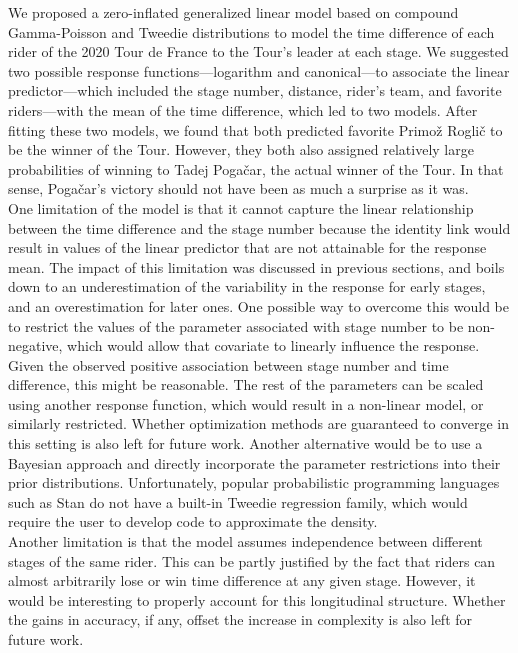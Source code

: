 \documentclass[aos,preprint]{imsart}
\begin{document}
We proposed a zero-inflated generalized linear model based on compound Gamma-Poisson and Tweedie distributions to model the time difference of each rider of the 2020 Tour de France to the Tour's leader at each stage. We suggested two possible response functions---logarithm and canonical---to associate the linear predictor---which included the stage number, distance, rider's team, and favorite riders---with the mean of the time difference, which led to two models. After fitting these two models, we found that both predicted favorite Primož Roglič to be the winner of the Tour. However, they both also assigned relatively large probabilities of winning to Tadej Pogačar, the actual winner of the Tour. In that sense, Pogačar's victory should not have been as much a surprise as it was. \\


One limitation of the model is that it cannot capture the linear relationship between the time difference and the stage number because the identity link would result in values of the linear predictor that are not attainable for the response mean. The impact of this limitation was discussed in previous sections, and boils down to an underestimation of the variability in the response for early stages, and an overestimation for later ones. One possible way to overcome this would be to restrict the values of the parameter associated with stage number to be non-negative, which would allow that covariate to linearly influence the response. Given the observed positive association between stage number and time difference, this might be reasonable. The rest of the parameters can be scaled using another response function, which would result in a non-linear model, or similarly restricted. Whether optimization methods are guaranteed to converge in this setting is also left for future work. Another alternative would be to use a Bayesian approach and directly incorporate the parameter restrictions into their prior distributions. Unfortunately, popular probabilistic programming languages such as \textsf{Stan} do not have a built-in Tweedie regression family, which would require the user to develop code to approximate the density. \\


Another limitation is that the model assumes independence between different stages of the same rider. This can be partly justified by the fact that riders can almost arbitrarily lose or win time difference at any given stage. However, it would be interesting to properly account for this longitudinal structure. Whether the gains in accuracy, if any, offset the increase in complexity is also left for future work. \\
\end{document}
